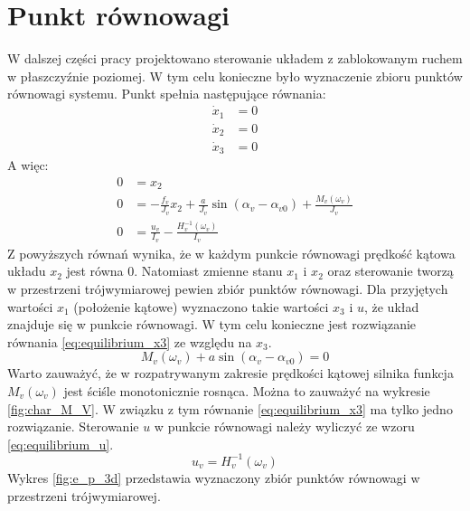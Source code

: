 \documentclass[11pt,a4paper]{article}
\begin{document}
\section{Punkt równowagi}
\label{sec:punktrownowagi}
W dalszej części pracy projektowano sterowanie układem z zablokowanym ruchem w płaszczyźnie poziomej. W tym celu konieczne było wyznaczenie zbioru punktów równowagi systemu. Punkt spełnia następujące równania:
\begin{equation}
\begin{aligned}
\dot x_1 &= 0\\
\dot x_2 &= 0\\
\dot x_3 &= 0
\end{aligned}
\end{equation}
A więc:
\begin{equation}
\begin{aligned}
0 &= x_2\\
0 &= -\frac{f_v}{J_v}x_2+\frac{a}{J_v}\sin (\alpha_v-\alpha_{v0})+\frac{M_v(\omega_v)}{J_v}\\
0 &= \frac{u_v}{I_v}-\frac{H_v^{-1}(\omega_v)}{I_v}
\end{aligned}
\label{eq:equilibrium_point}
\end{equation}
Z powyższych równań wynika, że w każdym punkcie równowagi prędkość kątowa układu \(x_2\) jest równa \(0\). Natomiast zmienne stanu \(x_1\) i \(x_2\) oraz sterowanie tworzą w przestrzeni trójwymiarowej pewien zbiór punktów równowagi. Dla przyjętych wartości \(x_1\) (położenie kątowe) wyznaczono takie wartości \(x_3\) i \(u\), że układ znajduje się w punkcie równowagi. W tym celu konieczne jest rozwiązanie równania \eqref{eq:equilibrium_x3} ze względu na \(x_3\).
\begin{equation}
M_v(\omega_v)+a\sin (\alpha_v-\alpha_{v0}) = 0
\label{eq:equilibrium_x3}
\end{equation}
Warto zauważyć, że w rozpatrywanym zakresie prędkości kątowej silnika funkcja \(M_v(\omega_v)\) jest ściśle monotonicznie rosnąca. Można to zauważyć na wykresie \ref{fig:char_M_V}. W związku z tym równanie \eqref{eq:equilibrium_x3} ma tylko jedno rozwiązanie. Sterowanie \(u\) w punkcie równowagi należy wyliczyć ze wzoru \eqref{eq:equilibrium_u}.
\begin{equation}
u_v = H_v^{-1}(\omega_v)
\label{eq:equilibrium_u}
\end{equation}
Wykres \ref{fig:e_p_3d} przedstawia wyznaczony zbiór punktów równowagi w przestrzeni trójwymiarowej.
\end{document}
